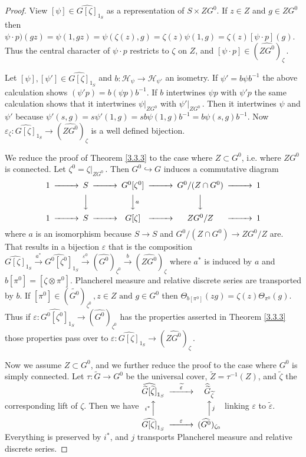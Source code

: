 \documentclass{conm-p-l}
\def\cH{\mathcal{H}}
\begin{document}
\begin{proof}
View $[\psi] \in \widehat{G[\zeta]}_{1_S}$ as a representation of 
$S\times ZG^0$.  If $z \in Z$ and $g \in ZG^0$ then $\psi\cdot p)(gz)
= \psi(1,gz) = \psi(\zeta(z),g) = \zeta(z)\psi(1,g) = \zeta(z)[\psi\cdot p](g)$.
Thus the central character of $\psi\cdot p$ restricts to $\zeta$ on $Z$,
and $[\psi\cdot p] \in (\widehat{ZG^0})_\zeta$\,.

Let $[\psi], [\psi'] \in \widehat{G[\zeta]}_{1_S}$ and $b:\cH_\psi \to
\cH_{\psi'}$ an isometry.  If $\psi' = b\psi b^{-1}$ the above calculation 
shows $(\psi' p) = b (\psi p)b^{-1}$.  If $b$ intertwines $\psi p$ with 
$\psi' p$ the same calculation shows that it intertwines $\psi|_{ZG^0}$
with $\psi'|_{ZG^0}$\,.  Then it intertwines $\psi$ and $\psi'$ because
$\psi'(s,g) = s\psi'(1,g) = sb\psi(1,g)b^{-1} = b\psi(s,g)b^{-1}$.  Now
$\varepsilon_\zeta : \widehat{G[\zeta]}_{1_S} \to (\widehat{ZG^0})_\zeta$
is a well defined bijection.

We reduce the proof of Theorem \ref{3.3.3} to the case where $Z \subset G^0$,
i.e. where $ZG^0$ is connected.  Let $\zeta^0 = \zeta|_{ZG^0}$\,.
Then $G^0 \hookrightarrow G$ induces a commutative diagram
{\tiny $$ \begin{CD}
1 @>>> S @>>> G^0[\zeta^0] @>>> G^0/(Z\cap G^0) @>>> 1 \\
@.   @VVV          @VV{a}V            @VVV          \\
1 @>>> S @>>> G[\zeta] @>>> ZG^0/Z @>>> 1
\end{CD} $$}
where $a$ is an isomorphism because $S \to S$ and $G^0/(Z\cap G^0) \to 
ZG^0/Z$ are.  That results in a bijection $\varepsilon$ that is the
composition $\widehat{G[\zeta]}_{1_S} \overset{a^*}{\rightarrow}
\widehat{G^0[\zeta^0]}_{1_S} \overset{\varepsilon^0}{\rightarrow}
(\widehat{G^0})_{\zeta^0} \overset{b}{\rightarrow} 
(\widehat{ZG^0})_\zeta$
where $a^*$ is induced by $a$ and $b[\pi^0] = [\zeta\otimes\pi^0]$.
Plancherel measure and relative discrete series are transported by $b$.
If $[\pi^0] \in (\widetilde{G^0})_{\zeta^0}\,, z \in Z \text{ and } g \in G^0$
then $\Theta_{b[\pi^0]}(zg) = \zeta(z)\Theta_{\pi^0}(g)$.  Thus if
$\varepsilon: \widehat{G^0[\zeta^0]}_{1_S} \to (\widehat{G^0})_{\zeta^0}$ 
has the properties asserted in Theorem \ref{3.3.3} those properties pass over
to $\varepsilon : \widehat{G[\zeta]}_{1_S} \to (\widehat{ZG^0})_\zeta$\,.

Now we assume $Z \subset G^0$, and we further reduce the proof to the case
where $G^0$ is simply connected.  Let $\tau:\widetilde{G} \to G^0$ be
the universal cover, $\widetilde{Z} = \tau^{-1}(Z)$, and $\widetilde{\zeta}$
the corresponding lift of $\zeta$.  Then we have 
{\tiny $\begin{CD}
\widehat{\widetilde{G}[\widetilde{\zeta}]}_{1_S} @>{\widetilde{\varepsilon}}>>
	\widehat{\widetilde{G}}_{\widetilde{\zeta}} \\
@A{i^*}AA @AA{j}A \\
\widehat{G[\zeta]}_{1_S} @>{\varepsilon}>> (\widehat{G^0})_{\zeta_0}
\end{CD} $}
linking $\varepsilon$ to $\widetilde{\varepsilon}$.
Everything is preserved by $i^*$, and $j$ transports Plancherel measure and 
relative discrete series.


\end{proof}
\end{document}
